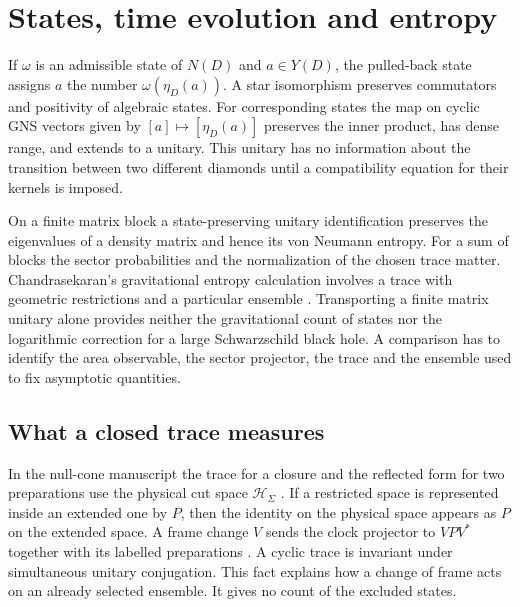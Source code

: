 \documentclass[11pt,letterpaper]{article}
\begin{document}
\section{States, time evolution and entropy}
If $\omega$ is an admissible state of $N(D)$ and $a\in Y(D)$, the pulled-back state assigns $a$ the number $\omega(\eta_D(a))$. A star isomorphism preserves commutators and positivity of algebraic states. For corresponding states the map on cyclic GNS vectors given by $[a]\mapsto[\eta_D(a)]$ preserves the inner product, has dense range, and extends to a unitary. This unitary has no information about the transition between two different diamonds until a compatibility equation for their kernels is imposed.

On a finite matrix block a state-preserving unitary identification preserves the eigenvalues of a density matrix and hence its von Neumann entropy. For a sum of blocks the sector probabilities and the normalization of the chosen trace matter. Chandrasekaran's gravitational entropy calculation involves a trace with geometric restrictions and a particular ensemble \cite[Sec.~5]{nc}. Transporting a finite matrix unitary alone provides neither the gravitational count of states nor the logarithmic correction for a large Schwarzschild black hole. A comparison has to identify the area observable, the sector projector, the trace and the ensemble used to fix asymptotic quantities.
\subsection{What a closed trace measures}
In the null-cone manuscript the trace for a closure and the reflected
form for two preparations use the physical cut space \(\mathcal H_\Sigma\)
\cite[Eq.~(E.15)]{nc}. If a restricted space is represented inside
an extended one by \(P\), then the identity on the physical space
appears as \(P\) on the extended space. A frame change \(V\) sends the
clock projector to \(VPV^*\) together with its labelled preparations
\cite[Eq.~(E.16)]{nc}. A cyclic trace is invariant under simultaneous
unitary conjugation. This fact explains how a change of frame acts on an
already selected ensemble. It gives no count of the excluded states.
\end{document}
